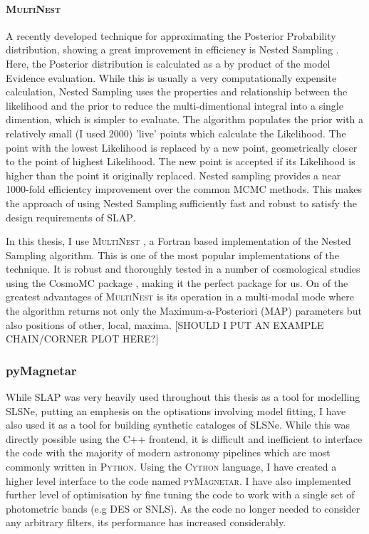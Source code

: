 \paragraph{\textsc{MultiNest}}
A recently developed technique for approximating the Posterior Probability distribution, showing a great improvement in efficiency is Nested Sampling \citep{Skilling2006}. Here, the Posterior distribution is calculated as a by product of the model Evidence evaluation. While this is usually a very computationally expensite calculation, Nested Sampling uses the properties and relationship between the likelihood and the prior to reduce the multi-dimentional integral into a single dimention, which is simpler to evaluate. The algorithm populates the prior with a relatively small (I used 2000) 'live' points which calculate the Likelihood. The point with the lowest Likelihood is replaced by a new point, geometrically closer to the point of highest Likelihood. The new point is accepted if its Likelihood is higher than the point it originally replaced. Nested sampling provides a near 1000-fold efficientcy improvement over the common MCMC methods. This makes the approach of using Nested Sampling sufficiently fast and robust to satisfy the design requirements of \textsc{SLAP}.

In this thesis, I use \textsc{MultiNest} \citep{Feroz2009,Feroz2011,Feroz2013}, a Fortran based implementation of the Nested Sampling algorithm. This is one of the most popular implementations of the technique. It is robust and thoroughly tested in a number of cosmological studies using the CosmoMC package \citep{Lewis2002}, making it the perfect package for us. On of the greatest advantages of \textsc{MultiNest} is its operation in a multi-modal mode where the algorithm returns not only the Maximum-a-Posteriori (MAP) parameters but also positions of other, local, maxima. [SHOULD I PUT AN EXAMPLE CHAIN/CORNER PLOT HERE?]

\subsubsection{pyMagnetar}
While SLAP was very heavily used throughout this thesis as a tool for modelling SLSNe, putting an emphesis on the optisations involving model fitting, I have also used it as a tool for building synthetic cataloges of SLSNe. While this was directly possible using the C++ frontend, it is difficult and inefficient to interface the code with the majority of modern astronomy pipelines which are most commonly written in \textsc{Python}. Using the \textsc{Cython} language, I have created a higher level interface to the code named \textsc{pyMagnetar}. I have also implemented further level of optimisation by fine tuning the code to work with a single set of photometric bands (e.g DES or SNLS). As the code no longer needed to consider any arbitrary filters, its performance has increased considerably.


